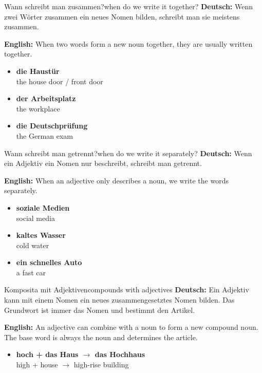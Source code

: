 \documentclass[a4paper,11pt]{article}
\newcommand{\GermanText}[1]{\textbf{Deutsch: }#1\par}
\newcommand{\EnglishText}[1]{{\small\color{SoftGray}\textbf{English: }#1\par}}
\newcommand{\ExampleItem}[2]{\item \textbf{#1}\\{\small\color{SoftGray}#2}}
\begin{document}
        \begin{grammarentry}{Wann schreibt man zusammen?}{when do we write it together?}
            \GermanText{Wenn zwei Wörter zusammen ein neues Nomen bilden, schreibt man sie meistens zusammen.}
            \EnglishText{When two words form a new noun together, they are usually written together.}
            
            \begin{exbox}
                \begin{itemize}
                    \ExampleItem{die Haustür}{the house door / front door}
                    \ExampleItem{der Arbeitsplatz}{the workplace}
                    \ExampleItem{die Deutschprüfung}{the German exam}
                \end{itemize}
            \end{exbox}
        \end{grammarentry}
        
        \begin{grammarentry}{Wann schreibt man getrennt?}{when do we write it separately?}
            \GermanText{Wenn ein Adjektiv ein Nomen nur beschreibt, schreibt man getrennt.}
            \EnglishText{When an adjective only describes a noun, we write the words separately.}
            
            \begin{exbox}
                \begin{itemize}
                    \ExampleItem{soziale Medien}{social media}
                    \ExampleItem{kaltes Wasser}{cold water}
                    \ExampleItem{ein schnelles Auto}{a fast car}
                \end{itemize}
            \end{exbox}
        \end{grammarentry}
        
        
        \begin{grammarentry}{Komposita mit Adjektiven}{compounds with adjectives}
            \GermanText{Ein Adjektiv kann mit einem Nomen ein neues zusammengesetztes Nomen bilden. Das Grundwort ist immer das Nomen und bestimmt den Artikel.}
            \EnglishText{An adjective can combine with a noun to form a new compound noun. The base word is always the noun and determines the article.}
            \begin{exbox}
                \begin{itemize}
                    \ExampleItem{hoch + das Haus $\rightarrow$ das Hochhaus}{high + house $\rightarrow$ high-rise building}
                \end{itemize}
            \end{exbox}
        \end{grammarentry}
        
\end{document}

